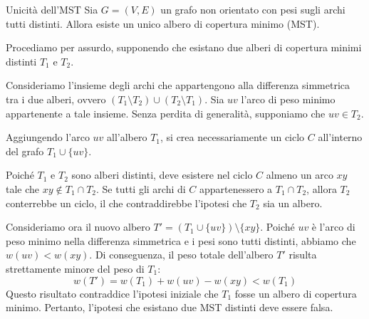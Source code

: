 \documentclass[12pt]{report}
\begin{document}
	\begin{teorema}{Unicità dell'MST}{}
		Sia $G = (V, E)$ un grafo non orientato con pesi sugli archi tutti distinti. Allora esiste un unico albero di copertura minimo (MST).
	\end{teorema}
	
	\begin{dimostrazione}{}{}
		Procediamo per assurdo, supponendo che esistano due alberi di copertura minimi distinti $T_1$ e $T_2$.
		
		Consideriamo l'insieme degli archi che appartengono alla differenza simmetrica tra i due alberi, ovvero $(T_1 \setminus T_2) \cup (T_2 \setminus T_1)$. Sia $uv$ l'arco di peso minimo appartenente a tale insieme. Senza perdita di generalità, supponiamo che $uv \in T_2$.
		
		Aggiungendo l'arco $uv$ all'albero $T_1$, si crea necessariamente un ciclo $C$ all'interno del grafo $T_1 \cup \{uv\}$.
		
		Poiché $T_1$ e $T_2$ sono alberi distinti, deve esistere nel ciclo $C$ almeno un arco $xy$ tale che $xy \notin T_1 \cap T_2$. Se tutti gli archi di $C$ appartenessero a $T_1 \cap T_2$, allora $T_2$ conterrebbe un ciclo, il che contraddirebbe l'ipotesi che $T_2$ sia un albero.
		
		Consideriamo ora il nuovo albero $T' = (T_1 \cup \{uv\}) \setminus \{xy\}$. Poiché $uv$ è l'arco di peso minimo nella differenza simmetrica e i pesi sono tutti distinti, abbiamo che $w(uv) < w(xy)$. Di conseguenza, il peso totale dell'albero $T'$ risulta strettamente minore del peso di $T_1$:
		\[
		w(T') = w(T_1) + w(uv) - w(xy) < w(T_1)
		\]
		Questo risultato contraddice l'ipotesi iniziale che $T_1$ fosse un albero di copertura minimo. Pertanto, l'ipotesi che esistano due MST distinti deve essere falsa.
	\end{dimostrazione}
	
\end{document}
